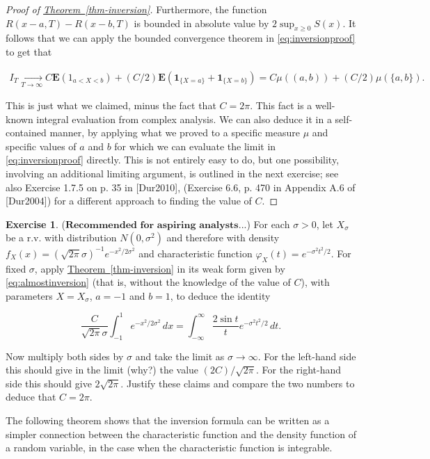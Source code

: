 \documentclass[11pt]{report}
\theoremstyle{plain}
\theoremstyle{definition}
\newtheorem{xexercise}[thm]{Exercise}
\begin{document}
\begin{proof}[Proof of \texorpdfstring{\hyperref[thm-inversion]{Theorem~\ref*{thm-inversion}}}{Theorem}]
\noindent Furthermore, the function $R(x-a,T)-R(x-b,T)$ is
bounded in absolute value by $2\sup_{x\ge 0} S(x)$.
It follows that we can apply the bounded convergence
theorem in \eqref{eq:inversionproof} to get that

\begin{align*}
\tag{13}\label{eq:almostinversion}
I_T \xrightarrow[T\to\infty]{} C \mathbf{E}(1_{a<X<b}) + (C/2) \mathbf{E}(\mathbf{1}_{\{X=a\}} + \mathbf{1}_{\{X=b\}}) = C \mu((a,b)) + (C/2)\mu(\{a,b\}).
\end{align*}

\noindent This is just what we claimed, minus the fact that
$C=2\pi$. This fact is a well-known integral
evaluation from complex analysis. We can also deduce
it in a self-contained manner, by applying what we
proved to a specific measure $\mu$ and specific
values of $a$ and $b$ for which we can evaluate the
limit in \eqref{eq:inversionproof} directly. This is not
entirely easy to do, but one possibility, involving an
additional limiting argument, is outlined in the next
exercise; see also Exercise 1.7.5 on p. 35 in
[Dur2010], (Exercise 6.6, p. 470 in Appendix A.6 of
[Dur2004]) for a different approach to finding the
value of $C$.
\end{proof}

\begin{xexercise}
($\textbf{Recommended for aspiring analysts}$...) For
each $\sigma>0$, let $X_\sigma$ be a r.v. with
distribution $N(0,\sigma^2)$ and therefore with
density
$f_X(x)=(\sqrt{2\pi}\sigma)^{-1} e^{-x^2/2\sigma^2}$
and characteristic function
$\varphi_X(t) = e^{-\sigma^2 t^2/2}$. For fixed
$\sigma$, apply \hyperref[thm-inversion]{Theorem~\ref*{thm-inversion}} in its weak
form given by \eqref{eq:almostinversion} (that is, without
the knowledge of the value of $C$), with parameters
$X=X_\sigma$, $a=-1$ and $b=1$,  to deduce the
identity

\[
\frac{C}{\sqrt{2\pi}\sigma} \int_{-1}^1 e^{-x^2/2\sigma^2}\,dx = \int_{-\infty}^\infty \frac{2\sin t}{t} e^{-\sigma^2 t^2/2}\,dt.
\]

\noindent Now multiply both sides by $\sigma$ and take the
limit as $\sigma\to\infty$. For the left-hand side
this should give in the limit (why?) the value
$(2C)/\sqrt{2\pi}$. For the right-hand side this
should give $2\sqrt{2\pi}$. Justify these claims and
compare the two numbers to deduce that $C=2\pi$.
\end{xexercise}

\noindent The following theorem shows that the inversion
formula can be written as a simpler connection between
the characteristic function and the density function
of a random variable, in the case when the
characteristic function is integrable.
\end{document}
